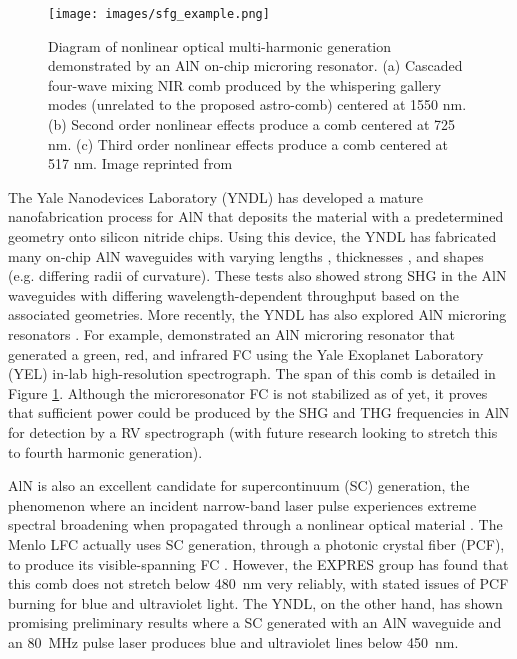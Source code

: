\begin{figure}
    \centering
    \texttt{[image: images/sfg\_example.png]}
    \caption{Diagram of nonlinear optical multi-harmonic generation demonstrated by an AlN on-chip microring resonator. (a) Cascaded four-wave mixing NIR comb produced by the whispering gallery modes (unrelated to the proposed astro-comb) centered at 1550 nm. (b) Second order nonlinear effects produce a comb centered at 725 nm. (c) Third order nonlinear effects produce a comb centered at 517 nm. Image reprinted from \cite{Jung2014a}}
    \label{fig:sfg_example}
\end{figure}

The Yale Nanodevices Laboratory (YNDL) has developed a mature nanofabrication process for AlN that deposits the material with a predetermined geometry onto silicon nitride chips. Using this device, the YNDL has fabricated many on-chip AlN waveguides with varying lengths \citep[\SI{300}{\micro\meter} to \SI{3}{\centi\meter};][]{Xiong2012a}, thicknesses \citep[330--\SI{1500}{\nano\meter};][]{Pernice2012}, and shapes (e.g. differing radii of curvature). These tests also showed strong SHG in the AlN waveguides with differing wavelength-dependent throughput based on the associated geometries. More recently, the YNDL has also explored AlN microring resonators \citep{Jung2013, Guo2016}. For example, \citet{Jung2014a} demonstrated an AlN microring resonator that generated a green, red, and infrared FC using the Yale Exoplanet Laboratory (YEL) in-lab high-resolution spectrograph. The span of this comb is detailed in Figure \ref{fig:sfg_example}. Although the microresonator FC is not stabilized as of yet, it proves that sufficient power could be produced by the SHG and THG frequencies in AlN for detection by a RV spectrograph (with future research looking to stretch this to fourth harmonic generation).



AlN is also an excellent candidate for supercontinuum (SC) generation, the phenomenon where an incident narrow-band laser pulse experiences extreme spectral broadening when propagated through a nonlinear optical material \citep{Dudley2006}. The Menlo LFC actually uses SC generation, through a photonic crystal fiber (PCF), to produce its visible-spanning FC \citep{Probst2014}. However, the EXPRES group has found that this comb does not stretch below \SI{480}{\nano\meter} very reliably, with stated issues of PCF burning for blue and ultraviolet light. The YNDL, on the other hand, has shown promising preliminary results where a SC generated with an AlN waveguide and an \SI{80}{\mega\hertz} pulse laser produces blue and ultraviolet lines below \SI{450}{\nano\meter}. 



